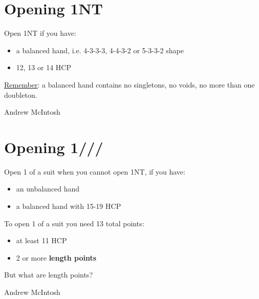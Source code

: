 \documentclass[14pt]{extarticle}
\begin{document}
\addtocounter{page}{5}
\newpage
\vspace*{\fill}
\begingroup
\centering
\section*{Opening 1NT}
\endgroup
Open 1NT if you have:\\
\begin{itemize}
\item a balanced hand, i.e. 4-3-3-3, 4-4-3-2 or 5-3-3-2 shape
\item 12, 13 or 14 HCP
\end{itemize}
\noindent \smallpencil \underline{Remember}: a balanced hand contains no singletons, no voids, no more than one doubleton.


\vspace*{\fill}
\begin{flushbottom}
 \begin{center}
 \tiny
 \textcopyright Andrew McIntosh
\end{center}
\end{flushbottom}


\newpage
\addtocounter{page}{1}

\vspace*{\fill}
\begingroup
\centering
\section*{Opening 1\textcolor{ForestGreen}{}/\textcolor{orange}{}/\textcolor{red}{}/\textcolor{blue}{}} 
\endgroup
\noindent Open 1 of a suit when you cannot open 1NT, if you have:\\
\begin{itemize}
\item an unbalanced hand
\item a balanced hand with 15-19 HCP
\end{itemize}
\vspace{0.15in}
\noindent To open 1 of a suit you need 13 total points:
\begin{itemize}
\item at least 11 HCP
\item 2 or more \textbf{length points}
\end{itemize}

\vspace{0.15in}
\noindent But what are length points?

\vspace*{\fill}
\begin{flushbottom}
 \begin{center}
 \tiny
 \textcopyright Andrew McIntosh
\end{center}
\end{flushbottom}
\end{document}
